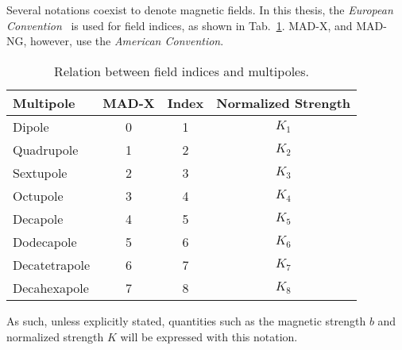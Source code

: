 \section{}

\subsection{}

Several notations coexist to denote magnetic fields. In this thesis, the
\textit{European Convention}~\cite{dilly_corrections_2022} is used for field indices, as shown
in Tab.~\ref{tab:magnetic_fields:relation_indices}. MAD-X, and MAD-NG, however, use the
\textit{American Convention}.

\begin{table}[H]
    \centering
    \begin{tabular}{lccc}
    \toprule
        Multipole     &      MAD-X        &     Index        & Normalized Strength \\
    \midrule
        Dipole        &     0             &     1            & $K_1$   \\       
        Quadrupole    &     1             &     2            & $K_2 $  \\
        Sextupole     &     2             &     3            & $K_3 $  \\
        Octupole      &     3             &     4            & $K_4 $  \\
        Decapole      &     4             &     5            & $K_5 $  \\
        Dodecapole    &     5             &     6            & $K_6 $  \\
        Decatetrapole &     6             &     7            & $K_7 $  \\
        Decahexapole  &     7             &     8            & $K_8 $  \\
    \bottomrule
    \end{tabular}
    \caption{Relation between field indices and multipoles.}
    \label{tab:magnetic_fields:relation_indices}
  \end{table}

As such, unless explicitly stated, quantities such as the magnetic strength $b$ and normalized
strength $K$ will be expressed with this notation. 


